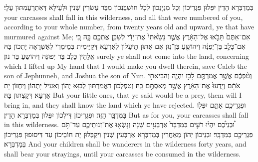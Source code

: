 {בְּמַדְבְּרָא הָדֵין יִפְּלוּן פִּגְרֵיכוֹן וְכָל מִנְיָנְכוֹן לְכָל חוּשְׁבָּנְכוֹן מִבַּר עֶשׂרִין שְׁנִין וּלְעֵילָא דְּאִתְרָעֲמִתּוּן עֲלָי׃}
{your carcasses shall fall in this wilderness, and all that were numbered of you, according to your whole number, from twenty years old and upward, ye that have murmured against Me;}{}
{אִם־אַתֶּם֙ תָּבֹ֣אוּ אֶל־הָאָ֔רֶץ אֲשֶׁ֤ר נָשָׂ֙אתִי֙ אֶת־יָדִ֔י לְשַׁכֵּ֥ן אֶתְכֶ֖ם בָּ֑הּ כִּ֚י אִם־כָּלֵ֣ב בֶּן־יְפֻנֶּ֔ה וִיהוֹשֻׁ֖עַ בִּן־נֽוּן׃}
{אִם אַתּוּן תֵּיעֲלוּן לְאַרְעָא דְּקַיֵּימִית בְּמֵימְרִי לְאַשְׁרָאָה יָתְכוֹן בַּהּ אֱלָהֵין כָּלֵב בַּר יְפוּנֶּה וִיהוֹשֻעַ בַּר נוּן׃}
{surely ye shall not come into the land, concerning which I lifted up My hand that I would make you dwell therein, save Caleb the son of Jephunneh, and Joshua the son of Nun.}{}
{וְטַ֨פְּכֶ֔ם אֲשֶׁ֥ר אֲמַרְתֶּ֖ם לָבַ֣ז יִהְיֶ֑ה וְהֵבֵיאתִ֣י אֹתָ֔ם וְיָֽדְעוּ֙ אֶת־הָאָ֔רֶץ אֲשֶׁ֥ר מְאַסְתֶּ֖ם בָּֽהּ׃}
{וְטַפְלְכוֹן דַּאֲמַרְתּוּן לְבִזָּא יְהוֹן וְאַעֵיל יָתְהוֹן וְיִחְזוֹן יָת אַרְעָא דְּקַצְתּוּן בַּהּ׃}
{But your little ones, that ye said would be a prey, them will I bring in, and they shall know the land which ye have rejected.}{}
{וּפִגְרֵיכֶ֖ם אַתֶּ֑ם יִפְּל֖וּ בַּמִּדְבָּ֥ר הַזֶּֽה׃
}
{וּפִגְרֵיכוֹן דִּילְכוֹן יִפְּלוּן בְּמַדְבְּרָא הָדֵין׃}
{But as for you, your carcasses shall fall in this wilderness.}{}
{וּ֠בְנֵיכֶ֠ם יִהְי֨וּ רֹעִ֤ים בַּמִּדְבָּר֙ אַרְבָּעִ֣ים שָׁנָ֔ה וְנָשְׂא֖וּ אֶת־זְנוּתֵיכֶ֑ם עַד־תֹּ֥ם פִּגְרֵיכֶ֖ם בַּמִּדְבָּֽר׃
}
{וּבְנֵיכוֹן יְהוֹן מְאַחֲרִין בְּמַדְבְּרָא אַרְבְּעִין שְׁנִין וִיקַבְּלוּן יָת חוֹבֵיכוֹן עַד דִּיסוּפוּן פִּגְרֵיכוֹן בְּמַדְבְּרָא׃}
{And your children shall be wanderers in the wilderness forty years, and shall bear your strayings, until your carcasses be consumed in the wilderness.}{}
